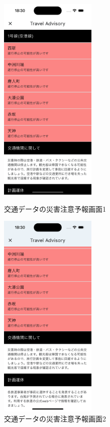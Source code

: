 \begin{figure}[H]
  \begin{minipage}[b]{0.45\linewidth}
    \centering
    \includegraphics[height=10cm]{./fig/trans_advisory_1.png}
    \caption{交通データの災害注意予報画面1}
    \label{fig:trans_advisory_1}
  \end{minipage}
  \begin{minipage}[b]{0.45\linewidth}
    \centering
    \includegraphics[height=10cm]{./fig/trans_advisory_2.png}
    \caption{交通データの災害注意予報画面2}
    \label{fig:trans_advisory_2}
  \end{minipage}
\end{figure}

